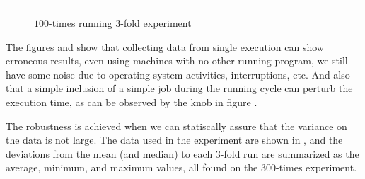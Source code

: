 \begin{figure}
  \centering
  \begin{minipage}[t]{\linewidth}
    \vspace{1em}
    \hrule
    \vspace{1em}
  \end{minipage}
  \caption{$100$-times running $3$-fold experiment}
  \label{fig:CProbust}
\end{figure}

The figures  and  show that collecting data from single execution can show erroneous results, even using machines with no other running program, we still have some noise due to operating system activities, interruptions, etc. And also that a simple inclusion of a simple job during the running cycle can perturb the execution time, as can be observed by the knob in figure .

The robustness is achieved when we can statiscally assure that the variance on the data is not large.
The data used in the experiment are shown in , and the deviations from the mean (and median) to each $3$-fold run are summarized as the average, minimum, and maximum values, all found on the $300$-times experiment.

